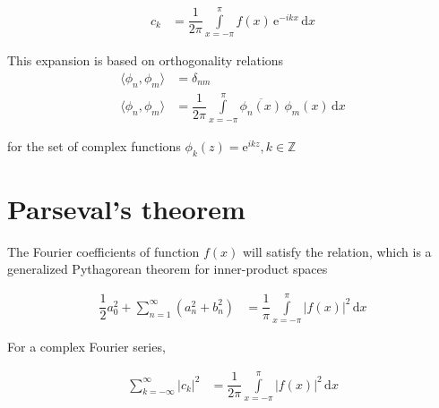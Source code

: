 \documentclass{article}
\begin{document}
\begin{align*} 
c_k &=  \dfrac{1}{2 \pi} \int \limits_{x=-\pi}^{\pi} f(x) \, \mathrm{e}^{-i k x} \, \mathrm{d} x
\end{align*}

This expansion is based on orthogonality relations
\begin{align*} 
\langle \phi_n, \phi_m \rangle &= \delta_{n m} \\
\langle \phi_n, \phi_m \rangle &= \dfrac{1}{2 \pi} \int \limits_{x=-\pi}^{\pi} \overline{\phi_n(x)} \, {\phi_m(x)} \, \mathrm{d} x
\end{align*}

for the set of complex functions $\phi_k(z) = \mathrm{e}^{i k z}, k \in \mathbb{Z}$

\section{Parseval's theorem}

The Fourier coefficients of function $f(x)$ will satisfy the relation, which is a generalized Pythagorean theorem for inner-product spaces

\begin{align*}
\dfrac{1}{2}a_0^2 + \sum_{n=1}^{\infty} (a_n^2+b_n^2) &=
  \dfrac{1}{\pi} \int \limits_{x=-\pi}^{\pi} \vert f(x) \vert^2 \, \mathrm{d} x
\end{align*}

For a complex Fourier series,

\begin{align*}
\sum_{k=-\infty}^{\infty} \vert c_k \vert^2 &=
  \dfrac{1}{2 \pi} \int \limits_{x=-\pi}^{\pi} \vert f(x) \vert^2 \, \mathrm{d} x
\end{align*}
\end{document}
